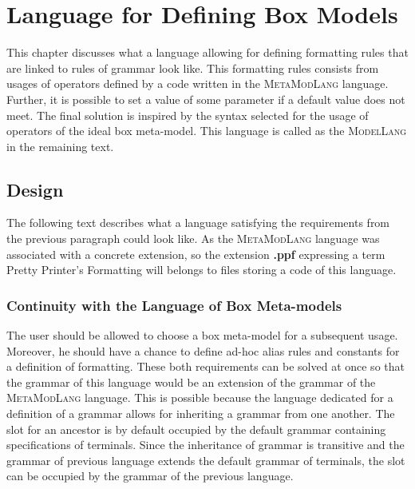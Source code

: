 \documentclass[12pt,notitlepage,a4paper]{report}
\begin{document}
\chapter{Language for Defining Box Models}

This chapter discusses what a language allowing for defining formatting rules that are linked to rules of grammar look like. This formatting rules consists from usages of operators defined by a code written in the \textsc{MetaModLang} language. Further, it is possible to set a value of some parameter if a default value does not meet.  The final solution is inspired by the syntax selected for the usage of operators of the ideal box meta-model. This language is called as the \textsc{ModelLang} in the remaining text. 

\section{Design}
The following text describes what a language satisfying the requirements from the previous paragraph could look like. As the \textsc{MetaModLang} language was associated with a concrete extension, so the extension \textbf{.ppf} expressing a term Pretty Printer's Formatting will belongs to files storing a code of this language.

\subsection{Continuity with the Language of Box Meta-models}

The user should be allowed to choose a box meta-model for a subsequent usage. Moreover, he should have a chance to define ad-hoc alias rules and constants for a definition of formatting. These both requirements can be solved at once so that the grammar of this language would be an extension of the grammar of the \textsc{MetaModLang} language. This is possible because the language dedicated for a definition of a grammar allows for inheriting a grammar from one another. The slot for an ancestor is by default occupied by the default grammar containing  specifications of terminals. Since the inheritance of grammar is transitive and the grammar of previous language extends the default grammar of terminals, the slot can be occupied by the grammar of the previous language.
\end{document}
